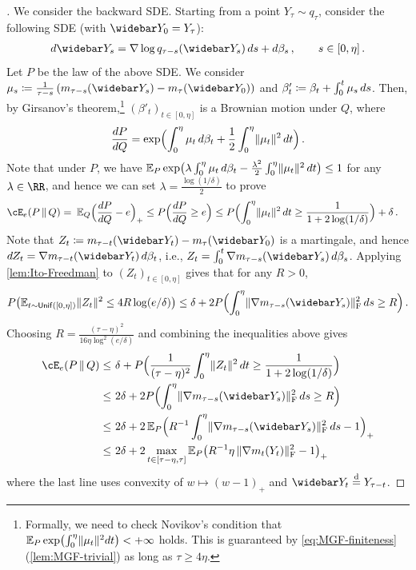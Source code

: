 \begin{proof}[]
 We consider the backward SDE.
Starting from a point $Y_\tau\sim q_\tau$, consider the following SDE (with $\Ybar_0=Y_\tau$):
\begin{align}
    d\Ybar_s=\nabla \log q_{\tau-s}(\Ybar_s)\,ds+d\beta_s\,, \qquad s\in[0,\eta]\,.
\end{align}
Let $P$ be the law of the above SDE. We consider $\mu_s\deq \frac{1}{\tau-s}\,(m_{\tau-s}(\Ybar_s)-m_\tau(\Ybar_0))$ and $\beta'_t\deq \beta_t+\int_0^t \mu_s\,ds$. Then, by Girsanov's theorem,\footnote{Formally, we need to check Novikov's condition that $\En_P \exp\prn*{ \int_0^\eta \nrm{\mu_t}^2 dt }<+\infty$ holds. This is guaranteed by \eqref{eq:MGF-finiteness} (\cref{lem:MGF-trivial}) as long as $\tau\geq 4\eta$. } $(\beta'_t)_{t\in [0,\eta]}$ is a Brownian motion under $Q$, where
\begin{align*}
    \frac{dP}{dQ}=\exp\prn[\Big]{ \int_0^\eta \mu_t \,d\beta_t+\frac12\int_0^\eta \nrm{\mu_t}^2\, dt }\,.
\end{align*}
Note that under $P$, we have $\En_P\exp\prn[\big]{ \lambda \int_0^\eta \mu_t\, d\beta_t-\frac{\lambda^2}{2}\int_0^\eta \nrm{\mu_t}^2\, dt }\leq 1$ for any $\lambda\in\RR$, and hence we can set $\lambda=\frac{\log(1/\delta)}{2}$ to prove
\begin{align*}
    \Dcov[e]{P}{Q}=&~\En_Q\prn[\Big]{ \frac{dP}{dQ}-e }_+\leq P\prn[\Big]{ \frac{dP}{dQ}\geq e }
    \leq P\prn[\Big]{ \int_0^\eta \nrm{\mu_t}^2\, dt\geq \frac{1}{1+2\log(1/\delta)} }+\delta\,.
\end{align*}
Note that $Z_t\deq m_{\tau-t}(\Ybar_t)-m_\tau(\Ybar_0)$ is a martingale, and hence $dZ_t=\nabla m_{\tau-t}(\Ybar_t)\, d\beta_t$, i.e., $Z_t=\int_0^t \nabla m_{\tau-s}(\Ybar_s) \, d\beta_s$. Applying \cref{lem:Ito-Freedman} to $(Z_t)_{t\in [0,\eta]}$ gives that for any $R>0$,
\begin{align*}
    P\prn*{ \En_{t\sim \unif([0,\eta])} \nrm{Z_t}^2\leq 4R\log(e/\delta)} 
    \leq \delta+2P\prn[\Big]{ \int_0^\eta \nrmF{\nabla m_{\tau-s}(\Ybar_s)}^2\,ds\geq R }\,.
\end{align*}
Choosing $R=\frac{(\tau-\eta)^2}{16\eta\log^2(e/\delta)}$ and combining the inequalities above gives
\begin{align*}
    \Dcov[e]{P}{Q}\leq&~ 
    \delta+ P\prn[\Big]{ \frac{1}{(\tau-\eta)^2}\int_0^\eta \nrm{Z_t}^2\, dt\geq \frac{1}{1+2\log(1/\delta)} }\\
    \leq&~ 2\delta+ 2P\prn[\Big]{ \int_0^\eta \nrmF{\nabla m_{\tau-s}(\Ybar_s)}^2\,ds\geq R } \\
    \leq&~ 2\delta+2\En_P\prn[\Big]{ R^{-1}\int_0^\eta \nrmF{\nabla m_{\tau-s}(\Ybar_s)}^2\,ds-1 }_+\\
    \leq&~ 2\delta+2\max_{t\in[\tau-\eta, \tau]}\En_P\prn*{ R^{-1}\eta\, \nrmF{\nabla m_{t}(Y_t)}^2-1 }_+
\end{align*}
where 
the last line uses convexity of $w\mapsto (w-1)_+$ and $\Ybar_t \eqd Y_{\tau-t}$.


\end{proof}
